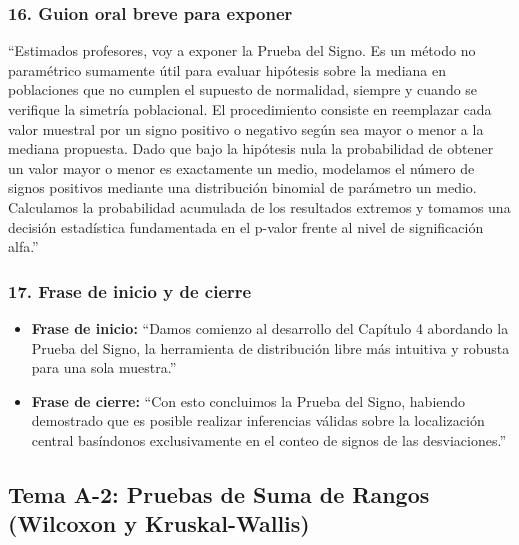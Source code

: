 \documentclass[11pt,a4paper]{article}
\begin{document}
\subsubsection{16. Guion oral breve para exponer}
\begin{guion}
    ``Estimados profesores, voy a exponer la Prueba del Signo. Es un método no paramétrico sumamente útil para evaluar hipótesis sobre la mediana en poblaciones que no cumplen el supuesto de normalidad, siempre y cuando se verifique la simetría poblacional. El procedimiento consiste en reemplazar cada valor muestral por un signo positivo o negativo según sea mayor o menor a la mediana propuesta. Dado que bajo la hipótesis nula la probabilidad de obtener un valor mayor o menor es exactamente un medio, modelamos el número de signos positivos mediante una distribución binomial de parámetro un medio. Calculamos la probabilidad acumulada de los resultados extremos y tomamos una decisión estadística fundamentada en el p-valor frente al nivel de significación alfa.''
\end{guion}

\subsubsection{17. Frase de inicio y de cierre}
\begin{itemize}
    \item \textbf{Frase de inicio:} ``Damos comienzo al desarrollo del Capítulo 4 abordando la Prueba del Signo, la herramienta de distribución libre más intuitiva y robusta para una sola muestra.''
    \item \textbf{Frase de cierre:} ``Con esto concluimos la Prueba del Signo, habiendo demostrado que es posible realizar inferencias válidas sobre la localización central basíndonos exclusivamente en el conteo de signos de las desviaciones.''
\end{itemize}

\newpage
\subsection{Tema A-2: Pruebas de Suma de Rangos (Wilcoxon y Kruskal-Wallis)}
\end{document}

